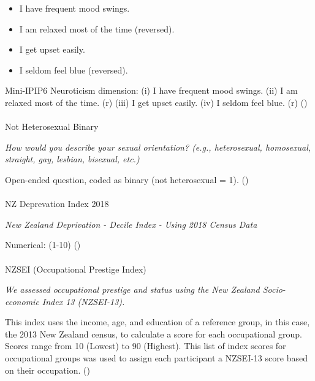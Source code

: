 \documentclass[
  single column]{article}
\makeatletter
\let\oldparagraph\paragraph
\renewcommand{\paragraph}{
    \@ifstar
      \xxxParagraphStar
      \xxxParagraphNoStar
  }
\newcommand{\xxxParagraphStar}[1]{\oldparagraph*{#1}\mbox{}}
\newcommand{\xxxParagraphNoStar}[1]{\oldparagraph{#1}\mbox{}}
\providecommand{\tightlist}{%
  \setlength{\itemsep}{0pt}\setlength{\parskip}{0pt}}\usepackage{longtable,booktabs,array}
\makeatother
\begin{document}
\begin{itemize}
\tightlist
\item
  I have frequent mood swings.
\item
  I am relaxed most of the time (reversed).
\item
  I get upset easily.
\item
  I seldom feel blue (reversed).
\end{itemize}

Mini-IPIP6 Neuroticism dimension: (i) I have frequent mood swings. (ii)
I am relaxed most of the time. (r) (iii) I get upset easily. (iv) I
seldom feel blue. (r) ()

\paragraph{Not Heterosexual Binary}\label{not-heterosexual-binary}

\emph{How would you describe your sexual orientation? (e.g.,
heterosexual, homosexual, straight, gay, lesbian, bisexual, etc.)}

Open-ended question, coded as binary (not heterosexual = 1).
()

\paragraph{NZ Deprevation Index 2018}\label{nz-deprevation-index-2018}

\emph{New Zealand Deprivation - Decile Index - Using 2018 Census Data}

Numerical: (1-10) ()

\paragraph{NZSEI (Occupational Prestige
Index)}\label{nzsei-occupational-prestige-index}

\emph{We assessed occupational prestige and status using the New Zealand
Socio-economic Index 13 (NZSEI-13).}

This index uses the income, age, and education of a reference group, in
this case, the 2013 New Zealand census, to calculate a score for each
occupational group. Scores range from 10 (Lowest) to 90 (Highest). This
list of index scores for occupational groups was used to assign each
participant a NZSEI-13 score based on their occupation.
()
\end{document}
